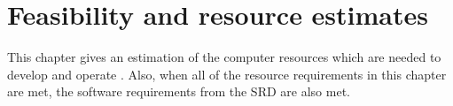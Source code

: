 \chapter{Feasibility and resource estimates}
\label{chap:feasresest}


This chapter gives an estimation of the computer resources which are needed to develop and operate \projectname. Also, when all of the resource requirements in this chapter are met, the software requirements  from the SRD \cite{srd} are also met. \\

